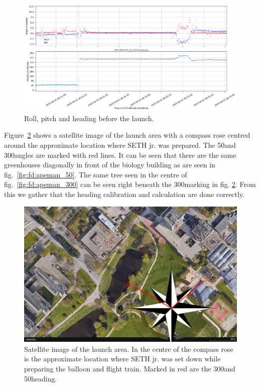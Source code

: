\begin{figure}[h]
    \centering
    \includegraphics[width=\linewidth]{images/05_flight_data/pre-launch_heading.png}
    \caption{Roll, pitch and heading before the launch.}
    \label{fig:fd:pre-launch_heading}
\end{figure}

Figure~\ref{fig:fd:compass_rose} shows a satellite image of the launch area with a compass rose centred around the approximate location where \ac{SETH} jr. was prepared. The 50\deg and 300\deg angles are marked with red lines. It can be seen that there are the same greenhouses diagonally in front of the biology building as are seen in fig.~\ref{fig:fd:apeman_50}. The same tree seen in the centre of fig.~\ref{fig:fd:apeman_300} can be seen right beneath the 300\deg marking in fig. \ref{fig:fd:compass_rose}. From this we gather that the heading calibration and calculation are done correctly.

\begin{figure}[h]
    \centering
    \includegraphics[width=\linewidth]{images/05_flight_data/launch_location_compass.png}
    \caption{Satellite image of the launch area. In the centre of the compass rose is the approximate location where \ac{SETH} jr. was set down while preparing the balloon and flight train. Marked in red are the 300\deg and 50\deg heading.}
    \label{fig:fd:compass_rose}
\end{figure}

